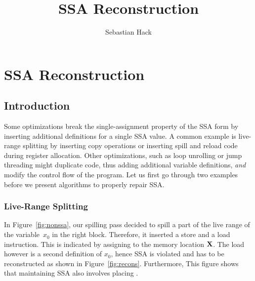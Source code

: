 
\newcommand{\var}[1]{\ensuremath{\mathtt{#1}}}

\title{SSA Reconstruction}
\author{Sebastian Hack}

\chapter{SSA Reconstruction }
\graphicspath{{repair_maintain_ssa_after_optimization/}{part1/repair_maintain_ssa_after_optimization/}}



\section{Introduction}

Some optimizations break the single-assignment property of the SSA form by inserting additional definitions for a single SSA value.
A common example is live-range splitting by inserting copy operations or inserting spill and reload code during register allocation.
Other optimizations, such as loop unrolling or jump threading might duplicate code, thus adding additional variable definitions, \emph{and} modify the control flow of the program.
Let us first go through two examples before we present algorithms to properly repair SSA.

\subsection{Live-Range Splitting}

In Figure~\ref{fig:nonssa}, our spilling pass decided to spill a part of the live range of the variable~$x_0$ in the right block.
Therefore, it inserted a store and a load instruction. 
This is indicated by assigning to the memory location $\textbf X$.
The load however is a second definition of $x_0$, hence SSA is violated and has to be reconstructed as shown in Figure~\ref{fig:recons}.
Furthermore, This figure shows that maintaining SSA also involves placing \phifuns.

